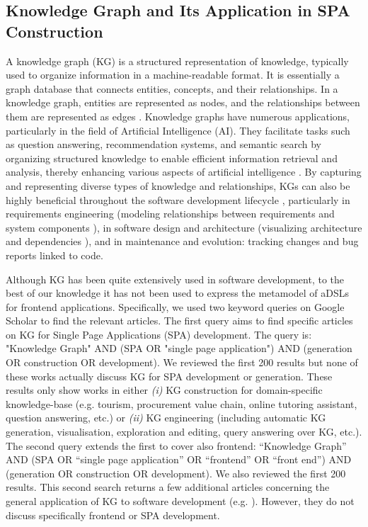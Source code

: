 \documentclass[runningheads]{llncs}
\begin{document}
\subsection{Knowledge Graph and Its Application in SPA Construction}
A knowledge graph (KG) is a structured representation of knowledge, typically used to organize information in a machine-readable format. It is essentially a graph database that connects entities, concepts, and their relationships. In a knowledge graph, entities are represented as nodes, and the relationships between them are represented as edges \cite{fensel_introduction_2020}. Knowledge graphs have numerous applications, particularly in the field of Artificial Intelligence (AI). They facilitate tasks such as question answering, recommendation systems, and semantic search by organizing structured knowledge to enable efficient information retrieval and analysis, thereby enhancing various aspects of artificial intelligence \cite{ji_survey_2022}. By capturing and representing diverse types of knowledge and relationships, KGs can also be highly beneficial throughout the software development lifecycle \cite{wang_application_2023}, particularly in requirements engineering (modeling relationships between requirements and system components \cite{Kasser_2000}), in software design and architecture (visualizing architecture and dependencies \cite{ali_babar_software_2009}), and in  maintenance and evolution: tracking changes and bug reports linked to code.

Although KG has been quite extensively used in software development, to the best of our knowledge it has not been used to express the metamodel of aDSLs for frontend applications. Specifically, we used two keyword queries on Google Scholar to find the relevant articles. The first query aims to find specific articles on  KG for Single Page Applications (SPA) development. The query is: "Knowledge Graph" AND (SPA OR "single page application") AND (generation OR construction OR development). We reviewed the first 200 results but none of these works actually discuss KG for SPA development or generation. These results only show works in either \textit{(i)} KG construction for domain-specific knowledge-base (e.g. tourism, procurement value chain, online tutoring assistant, question answering, etc.) or \textit{(ii)}  KG engineering (including automatic KG generation, visualisation, exploration and editing, query answering over KG, etc.). The second query extends the first to cover also frontend:  ``Knowledge Graph'' AND (SPA OR ``single page application'' OR ``frontend'' OR ``front end'') AND (generation OR construction OR development). We also reviewed the first 200 results. This second search returns a few additional articles concerning the general application of KG to software development (e.g. \cite{lin_intelligent_2017}). However, they do not discuss specifically frontend or SPA development.
\end{document}
